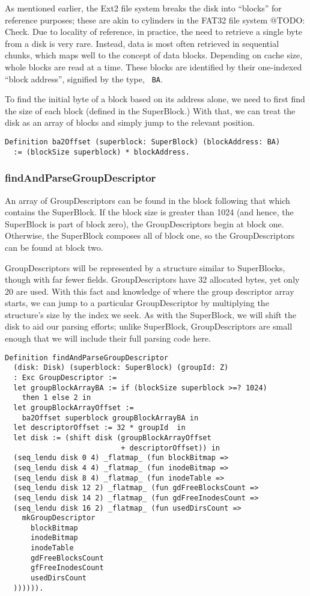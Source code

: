 \documentclass[nocopyrightspace]{sigplanconf}
\begin{document}
As mentioned earlier, the Ext2 file system breaks the disk into ``blocks'' for
reference purposes; these are akin to cylinders in the FAT32 file system
@TODO: Check. Due to locality of reference, in practice, the need to retrieve
a single byte from a disk is very rare. Instead, data is most often retrieved
in sequential chunks, which maps well to the concept of data blocks.
Depending on cache size, whole blocks are read at a time. These blocks are
identified by their one-indexed ``block address'', signified by the type, {\tt
BA}. 

To find the initial byte of a block based on its address alone, we need to
first find the size of each block (defined in the SuperBlock.) With that, we
can treat the disk as an array of blocks and simply jump to the relevant
position.

\begin{lstlisting}
Definition ba2Offset (superblock: SuperBlock) (blockAddress: BA)
  := (blockSize superblock) * blockAddress.
\end{lstlisting}

\subsubsection{findAndParseGroupDescriptor}
An array of GroupDescriptors can be found in the block following that which
contains the SuperBlock. If the block size is greater than 1024 (and hence,
the SuperBlock is part of block zero), the GroupDescriptors begin at block
one. Otherwise, the SuperBlock composes all of block one, so the
GroupDescriptors can be found at block two.

GroupDescriptors will be represented by a structure similar to SuperBlocks,
though with far fewer fields. GroupDescriptors have 32 allocated bytes, yet
only 20 are used. With this fact and knowledge of where the group descriptor
array starts, we can jump to a particular GroupDescriptor by multiplying the
structure's size by the index we seek. As with the SuperBlock, we will shift
the disk to aid our parsing efforts; unlike SuperBlock, GroupDescriptors are
small enough that we will include their full parsing code here.

\begin{lstlisting}
Definition findAndParseGroupDescriptor 
  (disk: Disk) (superblock: SuperBlock) (groupId: Z)
  : Exc GroupDescriptor :=
  let groupBlockArrayBA := if (blockSize superblock >=? 1024)
    then 1 else 2 in
  let groupBlockArrayOffset := 
    ba2Offset superblock groupBlockArrayBA in
  let descriptorOffset := 32 * groupId  in
  let disk := (shift disk (groupBlockArrayOffset 
                           + descriptorOffset)) in
  (seq_lendu disk 0 4) _flatmap_ (fun blockBitmap =>
  (seq_lendu disk 4 4) _flatmap_ (fun inodeBitmap =>
  (seq_lendu disk 8 4) _flatmap_ (fun inodeTable =>
  (seq_lendu disk 12 2) _flatmap_ (fun gdFreeBlocksCount =>
  (seq_lendu disk 14 2) _flatmap_ (fun gdFreeInodesCount =>
  (seq_lendu disk 16 2) _flatmap_ (fun usedDirsCount =>
    mkGroupDescriptor
      blockBitmap
      inodeBitmap
      inodeTable
      gdFreeBlocksCount
      gfFreeInodesCount
      usedDirsCount
  )))))).
\end{lstlisting}
\end{document}
